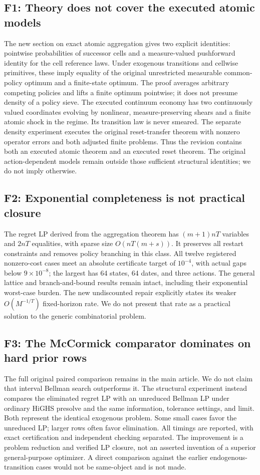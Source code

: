 \subsection*{F1: Theory does not cover the executed atomic models}
The new section on exact atomic aggregation gives two explicit identities: pointwise probabilities of successor cells and a measure-valued pushforward identity for the cell reference laws. Under exogenous transitions and cellwise primitives, these imply equality of the original unrestricted measurable common-policy optimum and a finite-state optimum. The proof averages arbitrary competing policies and lifts a finite optimum pointwise; it does not presume density of a policy sieve. The executed continuum economy has two continuously valued coordinates evolving by nonlinear, measure-preserving shears and a finite atomic shock in the regime. Its transition law is never smeared. The separate density experiment executes the original reset-transfer theorem with nonzero operator errors and both adjusted finite problems. Thus the revision contains both an executed atomic theorem and an executed reset theorem. The original action-dependent models remain outside those sufficient structural identities; we do not imply otherwise.

\subsection*{F2: Exponential completeness is not practical closure}
The regret LP derived from the aggregation theorem has $(m+1)nT$ variables and $2nT$ equalities, with sparse size $O(nT(m+s))$. It preserves all restart constraints and removes policy branching in this class. All twelve registered nonzero-cost cases meet an absolute certificate target of $10^{-4}$, with actual gaps below $9\times10^{-8}$; the largest has 64 states, 64 dates, and three actions. The general lattice and branch-and-bound results remain intact, including their exponential worst-case burden. The new undiscounted repair explicitly states its weaker $O(M^{-1/T})$ fixed-horizon rate. We do not present that rate as a practical solution to the generic combinatorial problem.

\subsection*{F3: The McCormick comparator dominates on hard prior rows}
The full original paired comparison remains in the main article. We do not claim that interval Bellman search outperforms it. The structural experiment instead compares the eliminated regret LP with an unreduced Bellman LP under ordinary HiGHS presolve and the same information, tolerance settings, and limit. Both represent the identical exogenous problem. Some small cases favor the unreduced LP; larger rows often favor elimination. All timings are reported, with exact certification and independent checking separated. The improvement is a problem reduction and verified LP closure, not an asserted invention of a superior general-purpose optimizer. A direct comparison against the earlier endogenous-transition cases would not be same-object and is not made.

